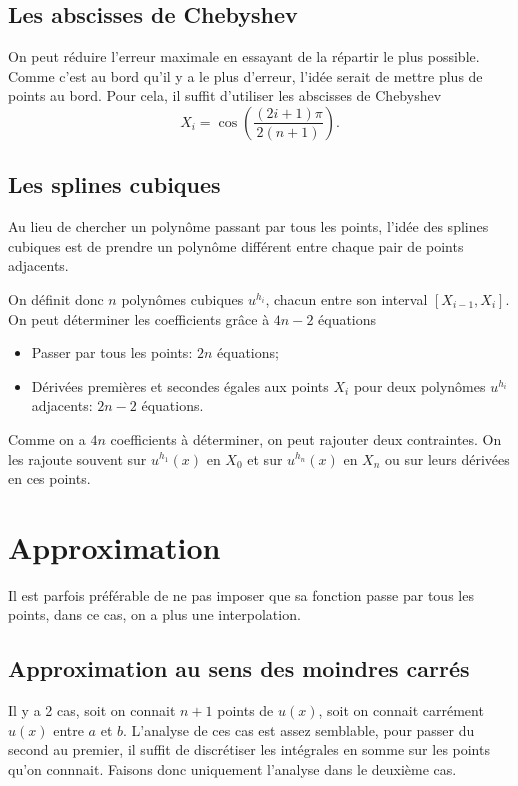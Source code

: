 \subsection{Les abscisses de Chebyshev}
On peut réduire l'erreur maximale en essayant de la répartir le plus possible.
Comme c'est au bord qu'il y a le plus d'erreur, l'idée serait de mettre
plus de points au bord.
Pour cela, il suffit d'utiliser les abscisses de Chebyshev
\[ X_i = \cos\left(\frac{(2i+1)\pi}{2(n+1)}\right). \]

\subsection{Les splines cubiques}
Au lieu de chercher un polynôme passant par tous les points, l'idée des
splines cubiques est de prendre un polynôme différent entre chaque pair
de points adjacents.

On définit donc $n$ polynômes cubiques $u^{h_i}$, chacun entre son
interval $[X_{i-1}, X_i]$.
On peut déterminer les coefficients grâce à $4n-2$ équations
\begin{itemize}
  \item Passer par tous les points: $2n$ équations;
  \item Dérivées premières et secondes égales aux points $X_i$
    pour deux polynômes $u^{h_i}$ adjacents: $2n-2$ équations.
\end{itemize}

Comme on a $4n$ coefficients à déterminer, on peut rajouter deux contraintes.
On les rajoute souvent sur $u^{h_1}(x)$ en $X_0$ et sur $u^{h_n}(x)$ en $X_n$
ou sur leurs dérivées en ces points.

\section{Approximation}
Il est parfois préférable de ne pas imposer que sa fonction passe par tous les
points, dans ce cas, on a plus une interpolation.

\subsection{Approximation au sens des moindres carrés}
Il y a 2 cas, soit on connait $n+1$ points de $u(x)$, soit on
connait carrément $u(x)$ entre $a$ et $b$.
L'analyse de ces cas est assez semblable, pour passer du second au premier,
il suffit de discrétiser les intégrales en somme sur les points qu'on connnait.
Faisons donc uniquement l'analyse dans le deuxième cas.


